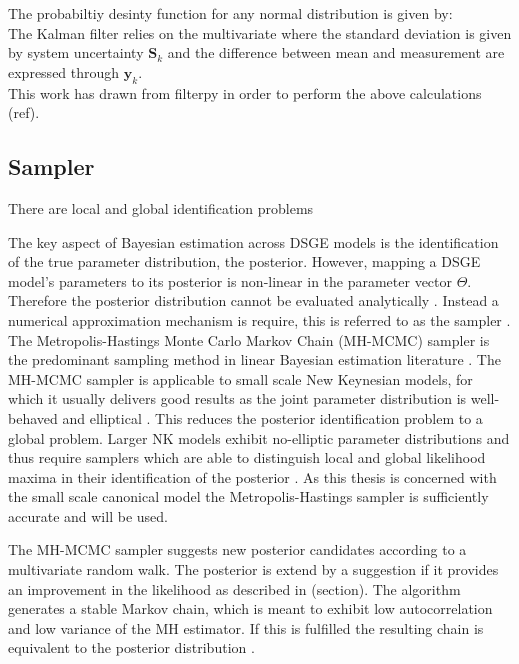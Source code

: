 \documentclass[12pt,a4paper,english]{article} %
\newcommand{\matr}[1]{\mathbf{#1}} %
\begin{document}
	
	
	
	The probabiltiy desinty function for any normal distribution is given by: 
	\[
	
	\]
	The Kalman filter relies on the multivariate where the standard deviation is given by system uncertainty $\matr{S}_k$ and the difference between mean and measurement are expressed through $\matr{y}_k$.
	\[
		
	\]
	This work has drawn from filterpy in order to perform the above calculations (ref).
	
	\subsection{Sampler}
	
	There are local and global identification problems 
	
	The key aspect of Bayesian estimation across DSGE models is the identification of the true parameter distribution, the posterior. However, mapping a DSGE model's parameters to its posterior is non-linear in the parameter vector $\Theta$. Therefore the posterior distribution cannot be evaluated analytically \cite{herbst_bayesian_2016}. Instead a numerical approximation mechanism is require, this is referred to as the sampler \cite{guerron-quintana_bayesian_2013}. The Metropolis-Hastings Monte Carlo Markov Chain (MH-MCMC) sampler is the predominant sampling method in linear Bayesian estimation literature \cite{guerron-quintana_bayesian_2013}. The MH-MCMC sampler is applicable to small scale New Keynesian models, for which it usually delivers good results as the joint parameter distribution is well-behaved and elliptical \cite{herbst_bayesian_2016}. This reduces the posterior identification problem to a global problem. Larger NK models exhibit no-elliptic parameter distributions and thus require samplers which are able to distinguish local and global likelihood maxima in their identification of the posterior \cite{herbst_bayesian_2016}. As this thesis is concerned with the small scale canonical model the Metropolis-Hastings sampler is sufficiently accurate and will be used.
	
	The MH-MCMC sampler suggests new posterior candidates according to a multivariate random walk. The posterior is extend by a suggestion if it provides an improvement in the likelihood as described in (section). The algorithm generates a stable Markov chain, which is meant to exhibit low autocorrelation and low variance of the MH estimator. If this is fulfilled the resulting chain is equivalent to the posterior distribution \cite{herbst_bayesian_2016}.	
		
\end{document}

